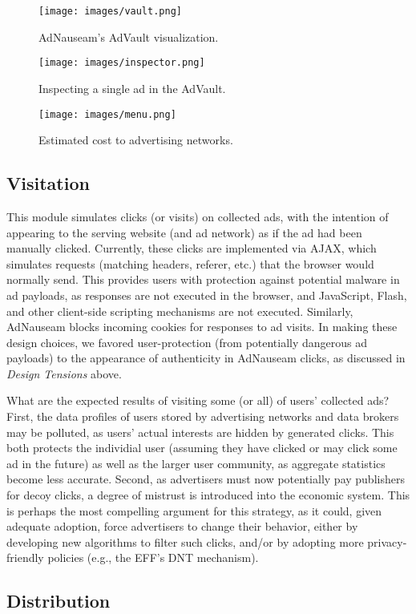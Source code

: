 \documentclass[conference]{IEEEtran}
\begin{document}
\begin{figure}[!t]
\centering
\texttt{[image: images/vault.png]}
\caption{AdNauseam's AdVault visualization.}
\label{fig:vault}
\vspace{2mm}
\texttt{[image: images/inspector.png]}
\caption{Inspecting a single ad in the AdVault.}
\label{fig:inspector}
\vspace{2mm}
\texttt{[image: images/menu.png]}
\caption{Estimated cost to advertising networks.}
\label{fig:menu}
\end{figure}


\subsection{Visitation}

This module simulates clicks (or visits) on collected ads, with the intention of appearing to the serving website (and ad network) as if the ad had been manually clicked. Currently, these clicks are implemented via AJAX, which simulates requests (matching headers, referer, etc.) that the browser would normally send. This provides users with protection against potential malware in ad payloads, as responses are not executed in the browser, and JavaScript, Flash, and other client-side scripting mechanisms are not executed. Similarly, AdNauseam blocks incoming cookies for responses to ad visits. In making these design choices, we favored user-protection (from potentially dangerous ad payloads) to the appearance of authenticity in AdNauseam clicks, as discussed in \emph{Design Tensions} above.

What are the expected results of visiting some (or all) of users' collected ads? First, the data profiles of users stored by advertising networks and data brokers may be polluted, as users' actual interests are hidden by generated clicks. This both protects the individial user (assuming they have clicked or may click some ad in the future) as well as the larger user community, as aggregate statistics become less accurate. Second, as advertisers must now potentially pay publishers for decoy clicks, a degree of mistrust is introduced into the economic system. This is perhaps the most compelling argument for this strategy, as it could, given adequate adoption, force advertisers to change their behavior, either by developing new algorithms to filter such clicks, and/or by adopting more privacy-friendly policies (e.g., the EFF's DNT mechanism).

\subsection{Distribution}
\end{document}
